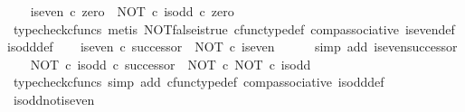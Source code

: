 \begin{isabellebody}
\ \ \isamarkupfalse%
\ {\isachardoublequoteopen}is{\isacharunderscore}{\kern0pt}even\ {\isasymcirc}\isactrlsub c\ zero\ {\isacharequal}{\kern0pt}\ {\isacharparenleft}{\kern0pt}NOT\ {\isasymcirc}\isactrlsub c\ is{\isacharunderscore}{\kern0pt}odd{\isacharparenright}{\kern0pt}\ {\isasymcirc}\isactrlsub c\ zero{\isachardoublequoteclose}\isanewline
\ \ \ \ \isamarkupfalse%
\ {\isacharparenleft}{\kern0pt}typecheck{\isacharunderscore}{\kern0pt}cfuncs{\isacharcomma}{\kern0pt}\ metis\ NOT{\isacharunderscore}{\kern0pt}false{\isacharunderscore}{\kern0pt}is{\isacharunderscore}{\kern0pt}true\ cfunc{\isacharunderscore}{\kern0pt}type{\isacharunderscore}{\kern0pt}def\ comp{\isacharunderscore}{\kern0pt}associative\ is{\isacharunderscore}{\kern0pt}even{\isacharunderscore}{\kern0pt}def{}\ is{\isacharunderscore}{\kern0pt}odd{\isacharunderscore}{\kern0pt}def{}{\isacharparenright}{\kern0pt}\isanewline
\isanewline
\ \ \isamarkupfalse%
\ {\isachardoublequoteopen}is{\isacharunderscore}{\kern0pt}even\ {\isasymcirc}\isactrlsub c\ successor\ {\isacharequal}{\kern0pt}\ NOT\ {\isasymcirc}\isactrlsub c\ is{\isacharunderscore}{\kern0pt}even{\isachardoublequoteclose}\isanewline
\ \ \ \ \isamarkupfalse%
\ {\isacharparenleft}{\kern0pt}simp\ add{\isacharcolon}{\kern0pt}\ is{\isacharunderscore}{\kern0pt}even{\isacharunderscore}{\kern0pt}successor{\isacharparenright}{\kern0pt}\isanewline
\isanewline
\ \ \isamarkupfalse%
\ {\isachardoublequoteopen}{\isacharparenleft}{\kern0pt}NOT\ {\isasymcirc}\isactrlsub c\ is{\isacharunderscore}{\kern0pt}odd{\isacharparenright}{\kern0pt}\ {\isasymcirc}\isactrlsub c\ successor\ {\isacharequal}{\kern0pt}\ NOT\ {\isasymcirc}\isactrlsub c\ NOT\ {\isasymcirc}\isactrlsub c\ is{\isacharunderscore}{\kern0pt}odd{\isachardoublequoteclose}\isanewline
\ \ \ \ \isamarkupfalse%
\ {\isacharparenleft}{\kern0pt}typecheck{\isacharunderscore}{\kern0pt}cfuncs{\isacharcomma}{\kern0pt}\ simp\ add{\isacharcolon}{\kern0pt}\ cfunc{\isacharunderscore}{\kern0pt}type{\isacharunderscore}{\kern0pt}def\ comp{\isacharunderscore}{\kern0pt}associative\ is{\isacharunderscore}{\kern0pt}odd{\isacharunderscore}{\kern0pt}def{}{\isacharparenright}{\kern0pt}\isanewline
{}\isamarkupfalse%
%
\endisatagproof
{\isafoldproof}%
%
\isadelimproof
\isanewline
%
\endisadelimproof
\isanewline
{}\isamarkupfalse%
\ is{\isacharunderscore}{\kern0pt}odd{\isacharunderscore}{\kern0pt}not{\isacharunderscore}{\kern0pt}is{\isacharunderscore}{\kern0pt}even{\isacharcolon}{\kern0pt}\isanewline

\end{isabellebody}
